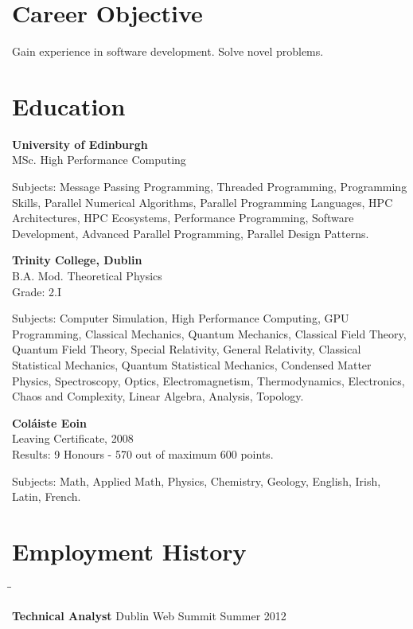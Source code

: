 \documentclass{res}
\newcommand{\fakeitem}{\hangindent=10pt\hangafter 1}
\newenvironment{employmentTitle}
{
        \begin{tabbing}
        \hspace{2.3in}\= \hspace{2.6in}\= \kill
}
{
        \end{tabbing}
        \vspace{-0.5\baselineskip}
}
\begin{document}
\begin{resume}



\section{Career Objective}

Gain experience in software development. Solve novel problems.



\section{Education}


{\bf University of Edinburgh}\\
MSc. High Performance Computing

\fakeitem
Subjects: Message Passing Programming, Threaded Programming, Programming Skills, Parallel Numerical Algorithms, Parallel Programming Languages, HPC Architectures, HPC Ecosystems, Performance Programming, Software Development, Advanced Parallel Programming, Parallel Design Patterns.

{\bf Trinity College, Dublin}\\
B.A. Mod. Theoretical Physics\\
Grade: 2.I

\fakeitem
Subjects:
Computer Simulation, High Performance Computing, GPU Programming, Classical Mechanics, Quantum Mechanics, Classical Field Theory, Quantum Field Theory, Special Relativity, General Relativity, Classical Statistical Mechanics, Quantum Statistical Mechanics, Condensed Matter Physics, Spectroscopy, Optics, Electromagnetism, Thermodynamics, Electronics, Chaos and Complexity, Linear Algebra, Analysis, Topology.

{\bf Col\'aiste Eoin}\\
Leaving Certificate, 2008\\
Results: 9 Honours - 570 out of maximum 600 points.

\fakeitem
Subjects:
Math, Applied Math, Physics, Chemistry, Geology, English, Irish, Latin, French.



\section{Employment History}

\begin{employmentTitle}
{\bf Technical Analyst}
\>Dublin Web Summit
\>Summer 2012
\end{employmentTitle}


\end{resume}
\end{document}
